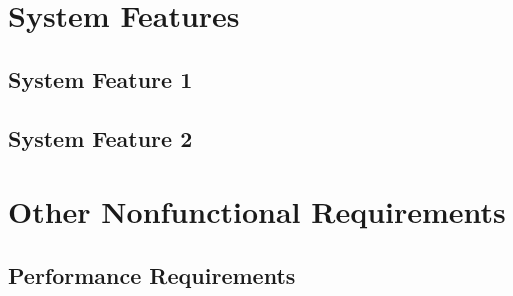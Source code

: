 \documentclass{article}
\newcommand{\comment}[1]{}
\begin{document}
\section{System Features}
\comment{
E.g.

Description and Priority: 
<Provide a short description of the feature and indicate whether it is of High, Medium or Low Priority. You could also include specific priority component ratings, such as benefit, penalty, cost, and risk (each rated on a relative scale from low of 1 to high of 9)>

Stimulus/Response Sequences: 
<List the sequences of user actions and system responses that stimulate behaviour defined for this feature. These will correspond to the dialog elements associated with use cases.>

Functional Requirments:
< Itemize the detailed functional requirements associated with this feature. These are the software capabilites that must be present in order for the user to carry out the services provided by the feature, or to execute the use case. Include how the product should respond to anticipated error conditions or invalid inputs. Requirements should be concise, complete, unambigious, verifiable, and necessary. Use "TBD" as a placeholder to indicate when necessary information is not yet available.>

<Each requirement should be uniquely identfied with a sequence number or a meaningful tab of some kind.>
	}
\subsection{System Feature 1}
\subsection{System Feature 2}

\section{Other Nonfunctional Requirements}
\subsection{Performance Requirements}
\comment{
If there are performance requirements for the product under various circumstances, stat them here and explain their rationale, to help developers understand the intent and make suitable design choices. Specift the timing relationships for real time systems. Make such requirements as specific as possible. You may need to state performance requirements for individual functional requirements or features.
	}
\end{document}
